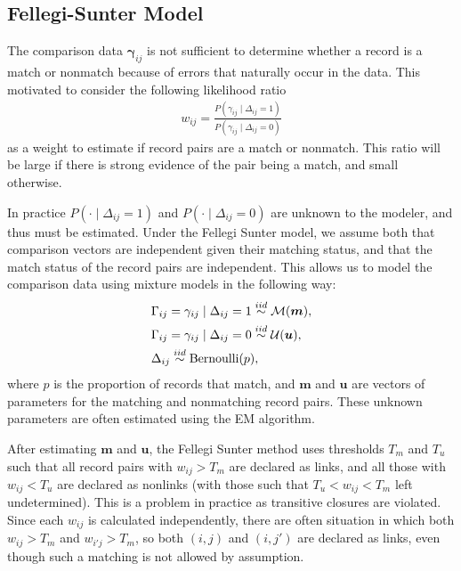 \documentclass[12pt,letterpaper]{article}
\newcommand{\1}[1]{\mathbb{I}\!\left[#1\right]} %
\begin{document}

\subsection{Fellegi-Sunter Model}
\label{fellegi-sunter}
The comparison data $\bm{\gamma}_{ij}$ is not sufficient to determine whether a record is a match or nonmatch because of errors that naturally occur in the data. This motivated \cite{fellegi_theory_1969} to consider the following likelihood ratio
\begin{align}
	\label{eqn:wts}
	w_{ij} = \frac{P(\gamma_{ij} \mid \Delta_{ij} = 1)}{P(\gamma_{ij} \mid \Delta_{ij} = 0)}
\end{align}
as a weight to estimate if record pairs are a match or nonmatch. This ratio will be large if there is strong evidence of the pair being a match, and small otherwise. 

In practice $P(\cdot \mid \Delta_{ij} = 1)$ and $P(\cdot \mid \Delta_{ij} = 0)$ are unknown to the modeler, and thus must be estimated. Under the Fellegi Sunter model, we assume both that comparison vectors are independent given their matching status, and that the match status of the record pairs are independent. This allows us to model 
the comparison data using mixture models in the following way:
\begin{align}
	&\Gamma_{ij} = \gamma_{ij} \mid \Delta_{ij} = 1 \stackrel{iid}{\sim} \mathcal{M}(\bm{m}), \\
	&\Gamma_{ij} = \gamma_{ij} \mid \Delta_{ij} = 0  \stackrel{iid}{\sim} \mathcal{U}(\bm{u}), \notag\\
	& \Delta_{ij}   \stackrel{iid}{\sim} \text{Bernoulli}(p), \notag
\end{align}
where $p$ is the proportion of records that match, and $\bm{m}$ and $\bm{u}$ are vectors of parameters for the matching and nonmatching record pairs. These unknown parameters are often estimated using the EM algorithm. 

After estimating $\bm{m}$ and $\bm{u}$, the Fellegi Sunter method uses thresholds $T_m$ and $T_u$ such that all record pairs with $w_{ij} > T_m$ are declared as links, and all those with $w_{ij} < T_u$ are declared as nonlinks (with those such that $T_u < w_{ij} < T_m$ left undetermined). This is a problem in practice as transitive closures are violated. Since each $w_{ij}$ is calculated independently, there are often situation in which both $w_{ij} > T_m$ and $w_{i'j} > T_m$, so both $(i,j)$ and $(i, j')$ are declared as links, even though such a matching is not allowed by assumption. 
\end{document}
